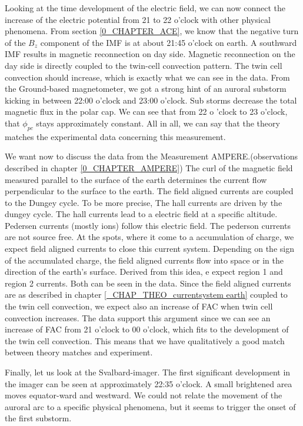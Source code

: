 \documentclass[10pt,a4paper]{article}
\begin{document}
Looking at the time development of the electric field, we can now connect the increase of the electric potential from 21 to 22 o'clock with other physical phenomena. 
From section \ref{0_CHAPTER_ACE}, we know that the negative turn of the $B_z$ component of the IMF is at about 21:45 o'clock on earth. A southward IMF results in 
magnetic reconnection on day side. Magnetic reconnection on the day side is directly coupled to the twin-cell convection pattern. The twin cell convection should increase,
which is exactly what we can see in the data. From the Ground-based magnetometer, we got a strong  hint of an auroral substorm kicking in between 22:00 o'clock and 
23:00 o'clock. Sub storms decrease the total magnetic flux in the polar cap. We can see that from 22 o 'clock to 23 o'clock, that $\phi_{pc}$ stays approximately constant.
All in all, we can say that the theory matches the experimental data concerning this measurement. 

We want now to discuss the data from the Measurement AMPERE.(observations described in chapter \ref{0_CHAPTER_AMPERE}) The  curl of the magnetic field measured parallel 
to the surface of the earth determines the current flow perpendicular to the surface to the earth. The field aligned currents are coupled to the Dungey cycle. To be more precise, The hall currents are driven by the dungey cycle. The hall currents lead to a electric field at a specific altitude. Pedersen currents (mostly ions) follow this electric field. The pederson currents are not source free. At the spots, where it come to a accumulation of charge, we expect field aligned currents to close this current system. Depending on the sign of the accumulated charge, the field aligned currents flow into space or in the direction of the earth's surface. 
Derived from this idea, e expect region 1 and region 2 currents. Both can be seen in the data. Since the field aligned currents are as described in chapter \ref{_CHAP_THEO_currentsystem earth} coupled to the twin cell convection, we expect also an increase of FAC when twin cell convection increases. The data support this argument since we can see an increase of FAC from 21 o'clock to 00 o'clock, which fits to the development of the twin cell convection. 
This means that we have qualitatively a good match between theory matches and experiment.

Finally, let us look at the Svalbard-imager. The first significant development in the imager can be seen at approximately 22:35 o'clock. A small brightened area moves 
equator-ward and westward. We could not relate the movement of the auroral arc to a specific physical phenomena, but it seems to trigger the onset of the first substorm. 
\end{document}
